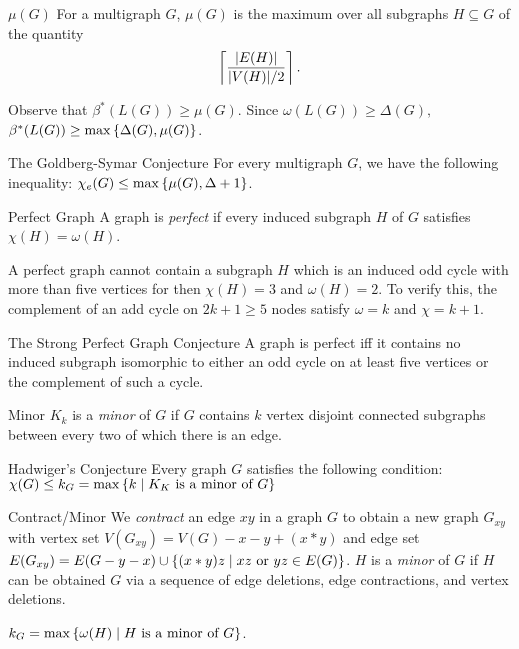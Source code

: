 \begin{df}{$\mu(G)$}
	For a multigraph $G$, $\mu(G)$ is the maximum over all subgraphs $H\subseteq G$ of the quantity \[\left\lceil \dfrac{\qty|E(H)|}{\qty|V(H)|/2} \right\rceil.\]
\end{df}
\begin{rmk}
	Observe that $\beta^*(L(G))\geq\mu(G)$. Since $\omega(L(G))\geq\Delta(G),$ $\beta^*(L(G))\geq\max\qty{\Delta(G),\mu(G)}$.	
\end{rmk}
\begin{conj}{The Goldberg-Symar Conjecture}
	For every multigraph $G$, we have the following inequality: $\chi_e(G)\leq\max\qty{\mu(G),\Delta+1}$.
\end{conj}
\begin{df}{Perfect Graph}
	A graph is \textit{perfect} if every induced subgraph $H$ of $G$ satisfies $\chi(H)=\omega(H)$. 
\end{df}
\begin{rmk}
	A perfect graph cannot contain a subgraph $H$ which is an induced odd cycle with more than five vertices for then $\chi(H)=3$ and $\omega(H)=2$. To verify this, the complement of an add cycle on $2k+1\geq5$ nodes satisfy $\omega=k$ and $\chi=k+1$.
\end{rmk}
\begin{conj}{The Strong Perfect Graph Conjecture}
	A graph is perfect iff it contains no induced subgraph isomorphic to either an odd cycle on at least five vertices or the complement of such a cycle. 	
\end{conj}
\begin{df}{Minor}
	$K_k$ is a \textit{minor} of $G$ if $G$ contains $k$ vertex disjoint connected subgraphs between every two of which there is an edge.	
\end{df}
\begin{conj}{Hadwiger's Conjecture}
	Every graph $G$ satisfies the following condition: $\chi(G)\leq k_G=\max\qty{k\mid K_K\text{ is a minor of }G}$
\end{conj}
\begin{df}{Contract/Minor}
	We \textit{contract} an edge $xy$ in a graph $G$ to obtain a new graph $G_{xy}$ with vertex set $V(G_{xy})=V(G)-x-y+(x*y)$ and edge set $E(G_{xy})=E(G-y-x)\cup\qty{(x*y)z\mid xz\text{ or }yz\in E(G)}$. $H$ is a \textit{minor} of $G$ if $H$ can be obtained $G$ via a sequence of edge deletions, edge contractions, and vertex deletions.	
\end{df}
\begin{rmk}
	$k_G=\max\qty{\omega(H)\mid H\text{ is a minor of }G}$.	
\end{rmk}
